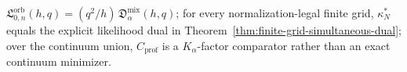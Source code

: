 \(\mathfrak L_{0,n}^{\mathrm{orb}}(h,q)=(q^2/h)\,\mathfrak D_{\alpha}^{\mathrm{mix}}(h,q)\); for every normalization-legal finite grid, \(\kappa_N^*\) equals the explicit likelihood dual in Theorem~\ref{thm:finite-grid-simultaneous-dual}; over the continuum union, \(C_{\mathrm{prof}}\) is a \(K_\alpha\)-factor comparator rather than an exact continuum minimizer.